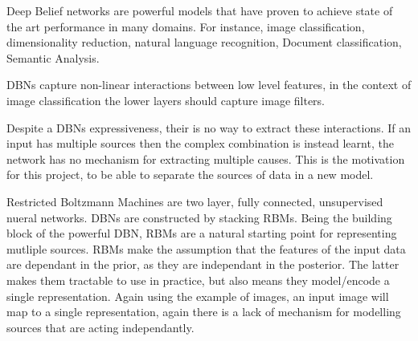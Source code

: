Deep Belief networks are powerful models that have proven to achieve state of the art performance in many domains. For instance, image classification, dimensionality reduction, natural language recognition, Document classification, Semantic Analysis.

DBNs capture non-linear interactions between low level features, in the context of image classification the lower layers should capture image filters.

Despite a DBNs expressiveness, their is no way to extract these interactions. If an input has multiple sources then the complex combination is instead learnt, the network has no mechanism for extracting multiple causes.
This is the motivation for this project, to be able to separate the sources of data in a new model.

Restricted Boltzmann Machines are two layer, fully connected, unsupervised nueral networks. DBNs are constructed by stacking RBMs. Being the building block of the powerful DBN, RBMs are a natural starting point for representing mutliple sources.
RBMs make the assumption that the features of the input data are dependant in the prior, as they are independant in the posterior. The latter makes them tractable to use in practice, but also means they model/encode a single representation.
  Again using the example of images, an input image will map to a single representation, again there is a lack of mechanism for modelling sources that are acting independantly.

